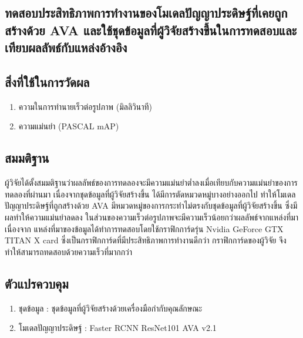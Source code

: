 \subsection{ทดสอบประสิทธิภาพการทำงานของโมเดลปัญญาประดิษฐ์ที่เคยถูกสร้างด้วย AVA และใช้ชุดข้อมูลที่ผู้วิจัยสร้างขึ้นในการทดสอบและเทียบผลลัพธ์กับแหล่งอ้างอิง}
\subsection*{สิ่งที่ใช้ในการวัดผล}
	\begin{enumerate}
		\setlength\itemsep{-0.25em}
		\item ความในการทำนายเร็วต่อรูปภาพ (มิลลิวินาที)
		\item ความแม่นยำ (PASCAL mAP)
	\end{enumerate}
\subsection*{สมมติฐาน}ผู้วิจัยได้ตั้งสมมติฐานว่าผลลัพธ์ของการทดลองจะมีความแม่นยำต่ำลงเมื่อเทียบกับความแม่นยำของการทดลองที่ผ่านมา เนื่องจากชุดข้อมูลที่ผู้วิจัยสร้างขึ้น ได้มีการตัดหมวดหมู่บางอย่างออกไป 
ทำให้โมเดลปัญญาประดิษฐ์ที่ถูกสร้างด้วย AVA มีหมวดหมู่ของการกระทำไม่ตรงกับชุดข้อมูลที่ผู้วิจัยสร้างขึ้น ซึ่งมีผลทำให้ความแม่นยำลดลง ในส่วนของความเร็วต่อรูปภาพจะมีความเร็วน้อยกว่าผลลัพธ์จากแหล่งที่มา เนื่องจาก แหล่งที่มาของข้อมูลได้ทำการทดสอบโดยใช้กราฟิกการ์ดรุ่น Nvidia GeForce GTX TITAN X card ซึ่งเป็นกราฟิกการ์ดที่มีประสิทธิภาพการทำงานดีกว่า กราฟิกการ์ดของผู้วิจัย จึงทำให้สามารถทดสอบด้วยความเร็วที่มากกว่า
\subsection*{ตัวแปรควบคุม}
	\begin{enumerate}
		\setlength\itemsep{-0.25em}
		\item ชุดข้อมูล : ชุดข้อมูลที่ผู้วิจัยสร้างด้วยเครื่องมือกำกับคุณลักษณะ
		\item โมเดลปัญญาประดิษฐ์ : Faster RCNN ResNet101 AVA v2.1
	\end{enumerate}
